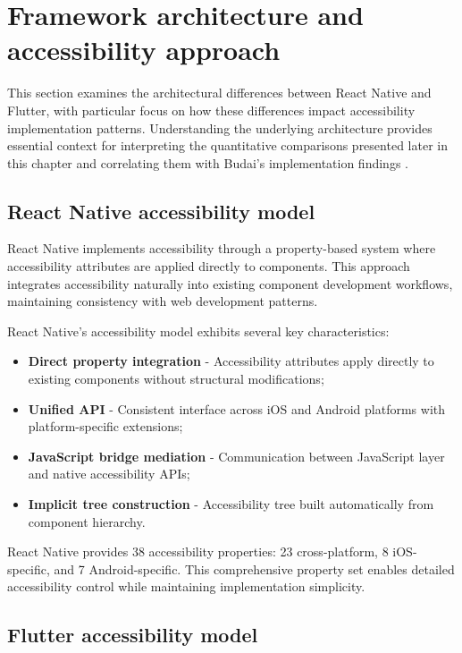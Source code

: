 \section{Framework architecture and accessibility approach}
\label{sec:framework-architecture}

This section examines the architectural differences between React Native and Flutter, with particular focus on how these differences impact accessibility implementation patterns. Understanding the underlying architecture provides essential context for interpreting the quantitative comparisons presented later in this chapter and correlating them with Budai's implementation findings \cite{budai2024mobile}.

\subsection{React Native accessibility model}

React Native implements accessibility through a property-based system where accessibility attributes are applied directly to components. This approach integrates accessibility naturally into existing component development workflows, maintaining consistency with web development patterns.

React Native's accessibility model exhibits several key characteristics:

\begin{itemize}
    \item \textbf{Direct property integration} - Accessibility attributes apply directly to existing components without structural modifications;
    \item \textbf{Unified API} - Consistent interface across iOS and Android platforms with platform-specific extensions;
    \item \textbf{JavaScript bridge mediation} - Communication between JavaScript layer and native accessibility APIs;
    \item \textbf{Implicit tree construction} - Accessibility tree built automatically from component hierarchy.
\end{itemize}

React Native provides 38 accessibility properties: 23 cross-platform, 8 iOS-specific, and 7 Android-specific. This comprehensive property set enables detailed accessibility control while maintaining implementation simplicity.

\subsection{Flutter accessibility model}


